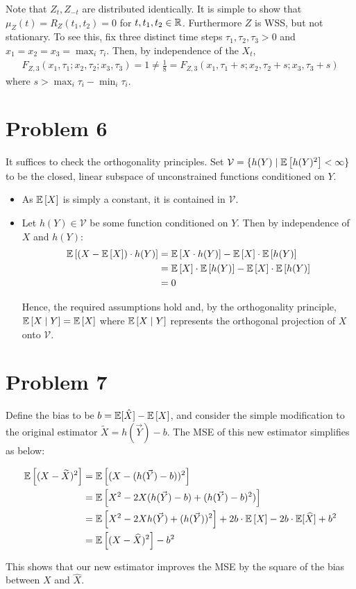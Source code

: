 \documentclass[12pt]{article}%
\begin{document}
\begin{enumerate}
Note that $Z_{t},Z_{-t}$ are distributed identically. It is simple to show that $\mu_{Z}(t) = R_Z(t_1,t_2) = 0$ for $t,t_1,t_2 \in {\mathbb{R}}$. Furthermore $Z$ is WSS, but not stationary. To see this, fix three distinct time steps $\tau_1,\tau_2, \tau_3 > 0$ and $x_1 = x_2 = x_3 = \max_i{\tau_i}$. Then, by independence of the $X_t$,
\begin{align*}
  F_{Z,3}(x_1,\tau_1;x_2,\tau_2;x_3,\tau_3) = 1 \neq \frac{1}{8} =  F_{Z,3}(x_1,\tau_1+s;x_2,\tau_2+s;x_3,\tau_3+s)
\end{align*}
where $s > \max_i{\tau_i} - \min_i{\tau_i}$.
\end{enumerate}

\section{Problem 6}
It suffices to check the orthogonality principles. Set $\mathcal{V} = \{h(Y)\mid \mathbb{E}\left[h(Y)^2\right] < \infty\}$ to be the closed, linear subspace of unconstrained functions conditioned on $Y$.
\begin{itemize}
  \item As $\mathbb{E}\left[X\right]$ is simply a constant, it is contained in $\mathcal{V}$.
  \item Let $h(Y) \in \mathcal{V}$ be some function conditioned on $Y$. Then by independence of $X$ and $h(Y)$:
  \begin{align*}
    \mathbb{E}\left[(X - \mathbb{E}\left[X\right])\cdot h(Y)\right] & = \mathbb{E}\left[X\cdot h(Y)\right] - \mathbb{E}\left[X\right]\cdot \mathbb{E}\left[h(Y)\right] \\
    & = \mathbb{E}\left[X\right]\cdot\mathbb{E}\left[h(Y)\right] - \mathbb{E}\left[X\right]\cdot\mathbb{E}\left[h(Y)\right] \\
    & = 0
  \end{align*}

  Hence, the required assumptions hold and, by the orthogonality principle, $\mathbb{E}\left[X\mid Y\right] = \mathbb{E}\left[X\right]$ where $\mathbb{E}\left[X\mid Y\right]$ represents the orthogonal projection of $X$ onto $\mathcal{V}$.
\end{itemize}

\section{Problem 7}

\def \bias {\mathbb{E}[\hat{X}] - \Exp{X}}

Define the bias to be $b  = \bias$, and consider the simple modification to the original estimator $\widetilde{X} = h(\vec{Y}) - b$. The MSE of this new estimator simplifies as below:

\begin{align*}
  \mathbb{E}\left[(X - \widetilde{X})^2\right] & = \mathbb{E}\left[(X - (h(\vec{Y}) - b))^2\right] \\
  & = \mathbb{E}\left[X^2 - 2X(h(\vec{Y}) - b) + (h(\vec{Y}) - b)^2)\right] \\
  & = \mathbb{E}\left[X^2 - 2Xh(\vec{Y}) + (h(\vec{Y}))^2\right] +  2b\cdot\mathbb{E}\left[X\right] - 2b\cdot\mathbb{E}[\widehat{X}] + b^2 \\
  & = \mathbb{E}\left[(X - \widehat{X})^2\right] - b^2
\end{align*}

This shows that our new estimator improves the MSE by the square of the bias between $X$ and $\widehat{X}$.
\end{document}
